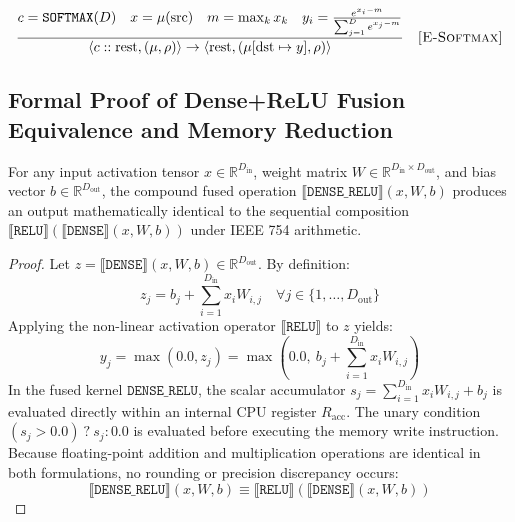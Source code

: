 \documentclass[11pt,a4paper]{article}
\begin{document}
\begin{equation}
\frac{c = \texttt{SOFTMAX}(D) \quad x = \mu(\text{src}) \quad m = \max_k x_k \quad y_i = \frac{e^{x_i - m}}{\sum_{j=1}^D e^{x_j - m}}}{\langle c :: \text{rest}, (\mu, \rho) \rangle \rightarrow \langle \text{rest}, (\mu[\text{dst} \mapsto y], \rho) \rangle} \quad \textsc{[E-Softmax]}
\end{equation}

\subsection{Formal Proof of Dense+ReLU Fusion Equivalence and Memory Reduction}
\label{sec:fusion_proof}

\begin{theorem}
For any input activation tensor $x \in \mathbb{R}^{D_{\text{in}}}$, weight matrix $W \in \mathbb{R}^{D_{\text{in}} \times D_{\text{out}}}$, and bias vector $b \in \mathbb{R}^{D_{\text{out}}}$, the compound fused operation $\llbracket \texttt{DENSE\_RELU} \rrbracket(x, W, b)$ produces an output mathematically identical to the sequential composition $\llbracket \texttt{RELU} \rrbracket(\llbracket \texttt{DENSE} \rrbracket(x, W, b))$ under IEEE 754 arithmetic.
\end{theorem}

\begin{proof}
Let $z = \llbracket \texttt{DENSE} \rrbracket(x, W, b) \in \mathbb{R}^{D_{\text{out}}}$. By definition:
\begin{equation}
z_j = b_j + \sum_{i=1}^{D_{\text{in}}} x_i W_{i,j} \quad \forall j \in \{1, \dots, D_{\text{out}}\}
\end{equation}
Applying the non-linear activation operator $\llbracket \texttt{RELU} \rrbracket$ to $z$ yields:
\begin{equation}
y_j = \max(0.0, z_j) = \max\left(0.0, \ b_j + \sum_{i=1}^{D_{\text{in}}} x_i W_{i,j}\right)
\end{equation}
In the fused kernel $\texttt{DENSE\_RELU}$, the scalar accumulator $s_j = \sum_{i=1}^{D_{\text{in}}} x_i W_{i,j} + b_j$ is evaluated directly within an internal CPU register $R_{\text{acc}}$. The unary condition $(s_j > 0.0) \ ? \ s_j : 0.0$ is evaluated before executing the memory write instruction. Because floating-point addition and multiplication operations are identical in both formulations, no rounding or precision discrepancy occurs:
\begin{equation}
\llbracket \texttt{DENSE\_RELU} \rrbracket(x, W, b) \equiv \llbracket \texttt{RELU} \rrbracket(\llbracket \texttt{DENSE} \rrbracket(x, W, b))
\end{equation}
\end{proof}
\end{document}
